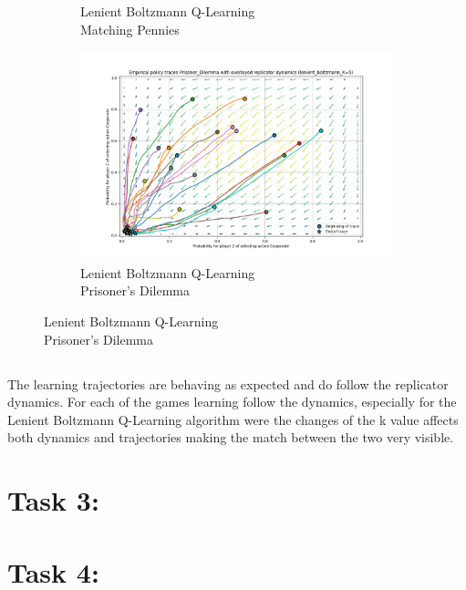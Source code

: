 \documentclass[12pt,letterpaper, onecolumn]{exam}
\begin{document}
\begin{figure}
\begin{subfigure}{.5\textwidth}
      \caption{Lenient Boltzmann Q-Learning\\ Matching Pennies}
      \label{fig:sfiglbmp}
    \end{subfigure}%
    \begin{subfigure}{.5\textwidth}
      \centering
      \includegraphics[width=.6\linewidth]{plots/replicator_trajectoreis_Prisoner_Dilemma_lenient_boltzmann_K=5.png}
      \caption{Lenient Boltzmann Q-Learning\\ Prisoner's Dilemma}
      \label{fig:sfiglbpd}
    \end{subfigure}%
\end{figure}

\subsection{}

The learning trajectories are behaving as expected and do follow the replicator dynamics. For each of the games learning follow the dynamics, especially for the Lenient Boltzmann Q-Learning algorithm
were the changes of the k value affects both dynamics and trajectories making the match between the two very visible.

\section{\textbf{Task 3:}}

\section{\textbf{Task 4:}}
\end{document}
